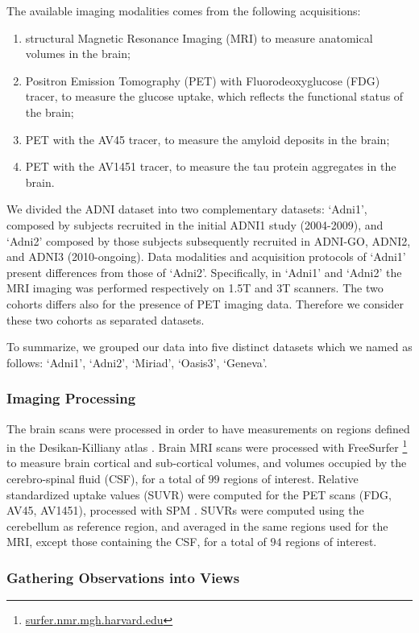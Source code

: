 The available imaging modalities comes from the following acquisitions:
%
\begin{enumerate}
\item structural Magnetic Resonance Imaging (MRI) to measure anatomical volumes in the brain;
%
\item Positron Emission Tomography (PET) with Fluorodeoxyglucose (FDG) tracer, to measure the glucose uptake, which reflects the functional status of the brain;
\item PET with the AV45 tracer, to measure the amyloid deposits in the brain;
\item PET with the AV1451 tracer, to measure the tau protein aggregates in the brain.
\end{enumerate}
%

We divided the ADNI dataset into two complementary datasets:
`Adni1', composed by subjects recruited in the initial ADNI1 study (2004-2009),
and `Adni2' composed by those subjects subsequently recruited in ADNI-GO, ADNI2, and ADNI3 (2010-ongoing).
Data modalities and acquisition protocols of `Adni1' present differences from those of `Adni2'.
Specifically, in `Adni1' and `Adni2' the MRI imaging was performed respectively on 1.5T and 3T scanners.
The two cohorts differs also for the presence of PET imaging data.
Therefore we consider these two cohorts as separated datasets.

To summarize, we grouped our data into five distinct datasets which we named as follows: `Adni1', `Adni2', `Miriad', `Oasis3', `Geneva'.

\subsubsection{Imaging Processing}
The brain scans were processed in order to have measurements on regions defined in the Desikan-Killiany atlas \citep{Desikan2006}.
Brain MRI scans were processed with FreeSurfer \footnote{\href{https://surfer.nmr.mgh.harvard.edu/}{surfer.nmr.mgh.harvard.edu}} \citep{freesurfer} to measure brain cortical and sub-cortical volumes, and volumes occupied by the cerebro-spinal fluid (CSF), for a total of $99$ regions of interest.
Relative standardized uptake values (SUVR) were computed for the PET scans (FDG, AV45, AV1451), processed with SPM \citep{Ashburner2000}.
SUVRs were computed using the cerebellum as reference region, and averaged in the same regions used for the MRI, except those containing the CSF, for a total of $94$ regions of interest.

\subsubsection{Gathering Observations into Views}
\label{ssec:views}


